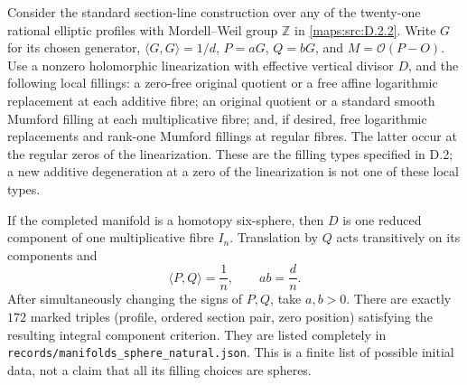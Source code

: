 \begin{theorem}\label{maps:src:D.2.22}


Consider the standard section-line construction over any of the twenty-one
rational elliptic profiles with Mordell--Weil group $\mathbb Z$ in \ref{maps:src:D.2.2}.
Write $G$ for its chosen generator, $\langle G,G\rangle=1/d$,
$P=aG$, $Q=bG$, and $M=\mathcal O(P-O)$. Use a nonzero holomorphic
linearization with effective vertical divisor $D$, and the following local
fillings: a zero-free original quotient or a free affine logarithmic
replacement at each additive fibre; an original quotient or a standard
smooth Mumford filling at each multiplicative fibre; and, if desired,
free logarithmic replacements and rank-one Mumford fillings at regular
fibres. The latter occur at the regular zeros of the linearization.
These are the filling types specified in D.2; a new additive degeneration
at a zero of the linearization is not one of these local types.

If the completed manifold is a homotopy six-sphere, then $D$ is one
reduced component of one multiplicative fibre $I_n$. Translation by $Q$
acts transitively on its components and
\[
             \langle P,Q\rangle=\frac1n,
             \qquad ab=\frac dn.                                      \tag{D.FI1}\label{maps:eq:D.FI1}
\]
After simultaneously changing the signs of $P,Q$, take $a,b>0$.
There are exactly $172$ marked triples (profile, ordered section pair,
zero position) satisfying the resulting integral component criterion.
They are listed completely in
\texttt{records/manifolds\_sphere\_natural.json}.
This is a finite list of possible initial data, not a claim that all
its filling choices are spheres.


\end{theorem}
